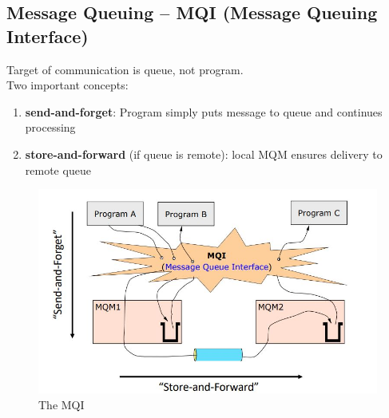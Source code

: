  		\pagebreak %
		 
		\subsection{Message Queuing -- MQI (Message Queuing Interface)}
			Target of communication is queue, not program.\\
			Two important concepts:
			\begin{enumerate}
				\item \textbf{send-and-forget}: Program simply puts message to queue and continues processing
				\item \textbf{store-and-forward} (if queue is remote): local MQM ensures delivery to remote queue

			\end{enumerate}
			\begin{figure}[h!]
				\includegraphics[scale=0.5]{res/mqi.jpg}
				\caption{The MQI}
			\end{figure}
		
